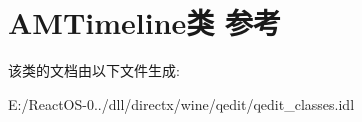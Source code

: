 \hypertarget{class_a_m_timeline}{}\section{A\+M\+Timeline类 参考}
\label{class_a_m_timeline}


该类的文档由以下文件生成\+:\begin{DoxyCompactItemize}
\item 
E\+:/\+React\+O\+S-\/0../dll/directx/wine/qedit/qedit\+\_\+classes.\+idl\end{DoxyCompactItemize}
